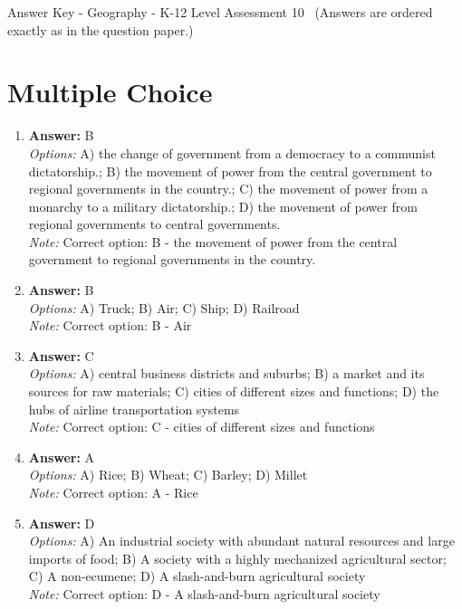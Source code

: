 \documentclass[12pt]{article}
\begin{document}
\begin{center}
Answer Key - Geography - K-12 Level Assessment 10 \
\small (Answers are ordered exactly as in the question paper.)
\end{center}

\section*{Multiple Choice}
\begin{enumerate}[label=\arabic*.]
\item \textbf{Answer:} B
\\ \textit{Options:} A) the change of government from a democracy to a communist dictatorship.; B) the movement of power from the central government to regional governments in the country.; C) the movement of power from a monarchy to a military dictatorship.; D) the movement of power from regional governments to central governments.
\\ \textit{Note:} Correct option: B - the movement of power from the central government to regional governments in the country.
\item \textbf{Answer:} B
\\ \textit{Options:} A) Truck; B) Air; C) Ship; D) Railroad
\\ \textit{Note:} Correct option: B - Air
\item \textbf{Answer:} C
\\ \textit{Options:} A) central business districts and suburbs; B) a market and its sources for raw materials; C) cities of different sizes and functions; D) the hubs of airline transportation systems
\\ \textit{Note:} Correct option: C - cities of different sizes and functions
\item \textbf{Answer:} A
\\ \textit{Options:} A) Rice; B) Wheat; C) Barley; D) Millet
\\ \textit{Note:} Correct option: A - Rice
\item \textbf{Answer:} D
\\ \textit{Options:} A) An industrial society with abundant natural resources and large imports of food; B) A society with a highly mechanized agricultural sector; C) A non-ecumene; D) A slash-and-burn agricultural society
\\ \textit{Note:} Correct option: D - A slash-and-burn agricultural society
\end{enumerate}
\end{document}
